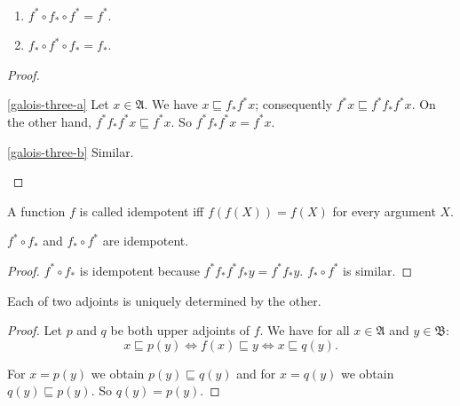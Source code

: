 \begin{thm}
~
\begin{enumerate}
\item \label{galois-three-a}$f^{\ast}\circ f_{\ast}\circ f^{\ast}=f^{\ast}$.
\item \label{galois-three-b}$f_{\ast}\circ f^{\ast}\circ f_{\ast}=f_{\ast}$.
\end{enumerate}
\end{thm}
\begin{proof}
~
\begin{disorder}
\item [{\ref{galois-three-a}}] Let $x\in\mathfrak{A}$. We have $x\sqsubseteq f_{\ast}f^{\ast}x$;
consequently $f^{\ast}x\sqsubseteq f^{\ast}f_{\ast}f^{\ast}x$. On
the other hand, $f^{\ast}f_{\ast}f^{\ast}x\sqsubseteq f^{\ast}x$.
So $f^{\ast}f_{\ast}f^{\ast}x=f^{\ast}x$.
\item [{\ref{galois-three-b}}] Similar.
\end{disorder}
\end{proof}
\begin{defn}
A function $f$ is called idempotent iff $f(f(X))=f(X)$
for every argument $X$.\end{defn}
\begin{prop}
$f^{\ast}\circ f_{\ast}$ and $f_{\ast}\circ f^{\ast}$ are idempotent.\end{prop}
\begin{proof}
$f^{\ast}\circ f_{\ast}$ is idempotent because $f^{\ast}f_{\ast}f^{\ast}f_{\ast}y=f^{\ast}f_{\ast}y$.
$f_{\ast}\circ f^{\ast}$ is similar.\end{proof}
\begin{thm}
\label{adj-by-other}Each of two adjoints is uniquely determined by
the other.\end{thm}
\begin{proof}
Let $p$ and $q$ be both upper adjoints of $f$. We have for all
$x\in\mathfrak{A}$ and $y\in\mathfrak{B}$:
\[
x\sqsubseteq p(y)\Leftrightarrow f(x)\sqsubseteq y\Leftrightarrow x\sqsubseteq q(y).
\]


For $x=p(y)$ we obtain $p(y)\sqsubseteq q(y)$ and for $x=q(y)$
we obtain $q(y)\sqsubseteq p(y)$. So $q(y)=p(y)$.\end{proof}
